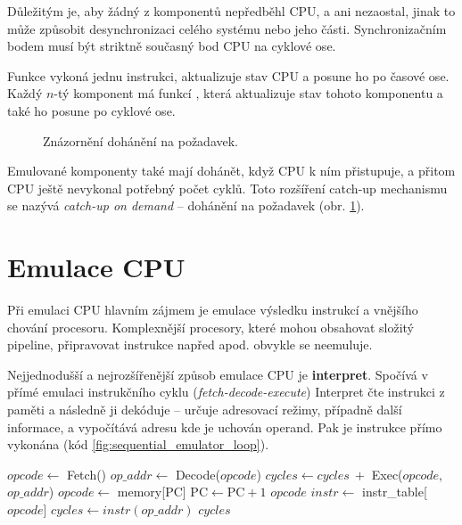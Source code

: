 Důležitým je, aby žádný z komponentů nepředběhl CPU, a ani nezaostal, jinak to může způsobit
desynchronizaci celého systému nebo jeho části. Synchronizačním bodem musí být striktně současný
bod CPU na cyklové ose.

Funkce  vykoná jednu instrukci, aktualizuje stav CPU a posune ho po časové ose. Každý
$n$-tý komponent má funkcí , která aktualizuje stav tohoto komponentu a také ho
posune po cyklové ose.

\begin{figure}[H]
    \centering
    
    \caption{Znázornění dohánění na požadavek.}
    \label{fig:emu_cycle_axis_on_demand}
\end{figure}

Emulované komponenty také mají dohánět, když CPU k ním přistupuje, a přitom CPU ještě nevykonal
potřebný počet cyklů. Toto rozšíření catch-up mechanismu se nazývá \textit{catch-up on demand} --
dohánění na požadavek (obr. \ref{fig:emu_cycle_axis_on_demand}).

\section{Emulace CPU}

Při emulaci CPU hlavním zájmem je emulace výsledku instrukcí a vnějšího chování procesoru.
Komplexnější procesory, které mohou obsahovat složitý pipeline, připravovat instrukce napřed apod.
obvykle se neemuluje.

Nejjednodušší a nejrozšířenější způsob emulace CPU je \textbf{interpret}. Spočívá v přímé emulaci
instrukčního cyklu (\textit{fetch-decode-execute}) Interpret čte instrukci z paměti a následně ji
dekóduje -- určuje adresovací režimy, případně další informace, a vypočítává adresu kde je uchován
operand. Pak je instrukce přímo vykonána (kód \ref{fig:sequential_emulator_loop}).\cite{bario2001}

\begin{code}
    \begin{algorithmic}
                \State $opcode \gets $ Fetch()
                \State $op\_addr \gets $ Decode($opcode$)
                \State $cycles \gets cycles\ + $ Exec($opcode$, $op\_addr$)
            \EndWhile
        \EndProcedure
        \State $opcode \gets$ memory[PC]
        \State $\text{PC} \gets \text{PC} + 1$
        \State \Return $opcode$
    \EndProcedure
        \State $instr \gets$ instr\_table[$opcode$]
        \State $cycles \gets instr(op\_addr)$
        \State \Return $cycles$
    \EndProcedure
    \end{algorithmic}
    \caption{Emulace CPU pomoci interpretu.}
    \label{fig:sequential_emulator_loop}
\end{code}

